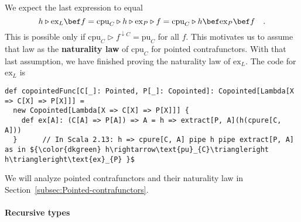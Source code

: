 We expect the last expression to equal 
\[
h\triangleright\text{ex}_{L}\bef f=\text{cpu}_{C}\triangleright h\triangleright\text{ex}_{P}\triangleright f=\text{cpu}_{C}\triangleright h\bef\text{ex}_{P}\bef f\quad.
\]
This is possible only if $\text{cpu}_{C}\triangleright f^{\downarrow C}=\text{pu}_{C}$
for all $f$. This motivates us to assume that law as the \textbf{naturality
law} of $\text{cpu}_{C}$ for pointed contrafunctors. With that last
assumption, we have finished proving the naturality law of $\text{ex}_{L}$.
The code for $\text{ex}_{L}$ is
\begin{lstlisting}[mathescape=true]
def copointedFunc[C[_]: Pointed, P[_]: Copointed]: Copointed[Lambda[X => C[X] => P[X]]] =
  new Copointed[Lambda[X => C[X] => P[X]]] {
    def ex[A]: (C[A] => P[A]) => A = h => extract[P, A](h(cpure[C, A]))
  }      // In Scala 2.13: h => cpure[C, A] pipe h pipe extract[P, A] as in ${\color{dkgreen} h\rightarrow\text{pu}_{C}\triangleright h\triangleright\text{ex}_{P} }$
\end{lstlisting}

We will analyze pointed contrafunctors and their naturality law in
Section~\ref{subsec:Pointed-contrafunctors}.

\paragraph{Recursive types}


